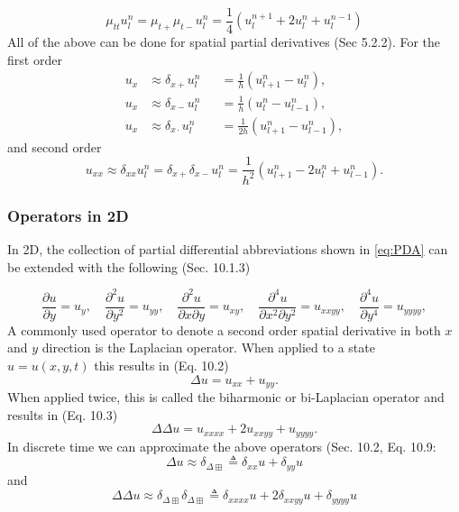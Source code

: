 \documentclass{article}
\begin{document}
\begin{equation}
    \mu_{tt} u_l^n = \mu_{t+}\mu_{t-}u_l^n = \frac{1}{4}(u_l^{n+1}+2u_l^n+u_l^{n-1})
\end{equation}
All of the above can be done for spatial partial derivatives (Sec 5.2.2). For the first order 
\begin{subequations}\label{eq:firstOrderSpace}
\begin{alignat}{2}
    u_x &\approx \delta_{x+}u_l^n &&= \frac{1}{h} (u_{l+1}^n - u_l^n),\\
    u_x &\approx \delta_{x-}u_l^n &&= \frac{1}{h} (u_l^n - u_{l-1}^n),\\
    u_x &\approx \delta_{x\cdot}u_l^n &&= \frac{1}{2h} (u_{l+1}^n - u_{l-1}^n),
\end{alignat}
\end{subequations}
and second order 
\begin{equation}\label{eq:secondOrderSpace}
    u_{xx} \approx \delta_{xx}u_l^n = \delta_{x+}\delta_{x-}u_l^n = \frac{1}{h^2} (u_{l+1}^n - 2u_l^n + u_{l-1}^n).
\end{equation}

\subsubsection{Operators in 2D}\label{subsec:2Doperators}
In 2D, the collection of partial differential abbreviations shown in \eqref{eq:PDA} can be extended with the following (Sec. 10.1.3)

\begin{equation}
    \frac{\partial u}{\partial y} = u_{y}, \quad \frac{\partial^2 u}{\partial y^2} = u_{yy}, \quad
    \frac{\partial^2 u}{\partial x\partial y} = u_{xy}, \quad
    \frac{\partial^4 u}{\partial x^2\partial y^2} = u_{xxyy}, \quad
    \frac{\partial^4 u}{\partial y^4} = u_{yyyy},
\end{equation}
A commonly used operator to denote a second order spatial derivative in both $x$ and $y$ direction is the Laplacian operator. When applied to a state $u=u(x,y,t)$ this results in (Eq. 10.2)
\begin{equation}
    \Delta u = u_{xx} + u_{yy}.
\end{equation}
When applied twice, this is called the biharmonic or bi-Laplacian operator and results in (Eq. 10.3) \begin{equation}
    \Delta\Delta u = u_{xxxx} + 2u_{xxyy} + u_{yyyy}.
\end{equation}
In discrete time we can approximate the above operators (Sec. 10.2, Eq. 10.9:
\begin{equation}
    \Delta u \approx \delta_{\Delta\boxplus} \triangleq \delta_{xx}u + \delta_{yy}u
\end{equation}
and 
\begin{equation}
    \Delta\Delta u \approx \delta_{\Delta\boxplus}\delta_{\Delta\boxplus} \triangleq \delta_{xxxx}u + 2\delta_{xxyy}u + \delta_{yyyy}u
\end{equation}
\end{document}
